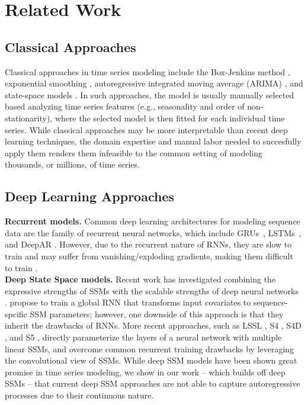%
\section{Related Work}
%


\subsection{Classical Approaches} \label{appendix:related_work_classical}

Classical approaches in time series modeling include the Box-Jenkins method \citep{box1968some}, exponential smoothing  \citep{hyndman2008forecasting, winters1960forecasting}, autoregressive integrated moving average (ARIMA) \citep{box1970time}, and state-space models \citep{hamilton1994state}. In such approaches, the model is usually manually selected based analyzing time series features (e.g., seasonality and order of non-stationarity), where the selected model is then fitted for each individual time series. While classical approaches may be more interpretable than recent deep learning techniques, the domain expertise and manual labor needed to succesfully apply them renders them infeasible to the common setting of modeling thousands, or millions, of time series.

\subsection{Deep Learning Approaches} \label{appendix:related_work_deep}

\textbf{Recurrent models.}  Common deep learning architectures for modeling sequence data are the family of recurrent neural networks, which include GRUs~\citep{chung2014empirical}, LSTMs~\citep{hochreiter1997long}, and DeepAR \citep{salinas2020deepar}. However, due to the recurrent nature of RNNs, they are slow to train and may suffer from vanishing/exploding gradients, making them difficult to train \citep{pascanu2013difficulty}. \\

\textbf{Deep State Space models.} Recent work has investigated combining the expressive strengths of SSMs with the scalable strengths of deep neural networks \citep{rangapuram2018, gu2021efficiently}. \cite{rangapuram2018} propose to train a global RNN that transforms input covariates to sequence-spcific SSM parameters; however, one downside of this approach is that they inherit the drawbacks of RNNs. More recent approaches, such as LSSL \citep{gu2021combining}, S4 \citep{gu2021efficiently}, S4D \citep{gu2022parameterization}, and S5 \citep{smith2022simplified}, directly parameterize the layers of a neural network with multiple linear SSMs, and overcome common recurrent training drawbacks by leveraging the convolutional view of SSMs. While deep SSM models have been shown great promise in time series modeling, we show in our work -- which builds off deep SSMs -- that current deep SSM approaches are not able to capture autoregressive processes due to their continuous nature.  \\


